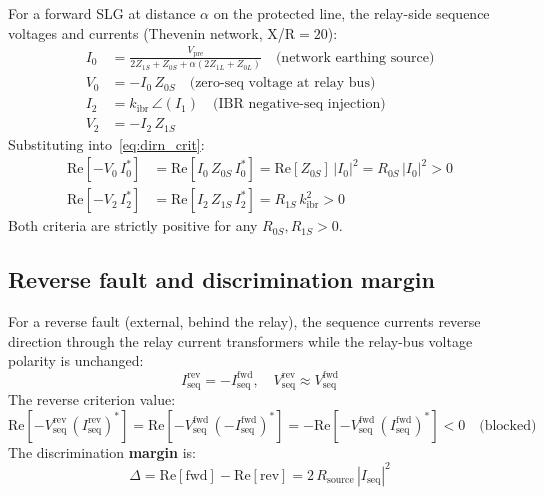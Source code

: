 \documentclass[11pt,a4paper]{article}
\begin{document}
For a forward SLG at distance $\alpha$ on the protected line, the relay-side
sequence voltages and currents (Thevenin network, X/R$=20$):
\begin{align}
  I_0 &= \frac{V_\mathrm{pre}}{2Z_{1S}+Z_{0S}+\alpha(2Z_{1L}+Z_{0L})}
         \quad\text{(network earthing source)} \label{eq:I0_fwd}\\
  V_0 &= -I_0\,Z_{0S}
         \quad\text{(zero-seq voltage at relay bus)} \label{eq:V0_fwd}\\
  I_2 &= k_\mathrm{ibr}\,\angle(I_1)
         \quad\text{(IBR negative-seq injection)} \label{eq:I2_fwd}\\
  V_2 &= -I_2\,Z_{1S} \label{eq:V2_fwd}
\end{align}
Substituting into~\eqref{eq:dirn_crit}:
\begin{align}
  \mathrm{Re}[-V_0\,I_0^*] &= \mathrm{Re}[I_0\,Z_{0S}\,I_0^*]
    = \mathrm{Re}[Z_{0S}]\,|I_0|^2 = R_{0S}\,|I_0|^2 > 0 \label{eq:crit_67n}\\
  \mathrm{Re}[-V_2\,I_2^*] &= \mathrm{Re}[I_2\,Z_{1S}\,I_2^*]
    = R_{1S}\,k_\mathrm{ibr}^2 > 0 \label{eq:crit_67q}
\end{align}
Both criteria are strictly positive for any $R_{0S}, R_{1S} > 0$.

\subsection{Reverse fault and discrimination margin}

For a reverse fault (external, behind the relay), the sequence currents reverse
direction through the relay current transformers while the relay-bus voltage
polarity is unchanged:
\begin{equation}
  I_\mathrm{seq}^\mathrm{rev} = -I_\mathrm{seq}^\mathrm{fwd},\quad
  V_\mathrm{seq}^\mathrm{rev} \approx V_\mathrm{seq}^\mathrm{fwd}
  \label{eq:rev_model}
\end{equation}
The reverse criterion value:
\begin{equation}
  \mathrm{Re}[-V_\mathrm{seq}^\mathrm{rev}\,(I_\mathrm{seq}^\mathrm{rev})^*]
  = \mathrm{Re}[-V_\mathrm{seq}^\mathrm{fwd}\,(-I_\mathrm{seq}^\mathrm{fwd})^*]
  = -\mathrm{Re}[-V_\mathrm{seq}^\mathrm{fwd}\,(I_\mathrm{seq}^\mathrm{fwd})^*]
  < 0 \quad\text{(blocked)}
  \label{eq:crit_rev}
\end{equation}
The discrimination \textbf{margin} is:
\begin{equation}
  \Delta = \mathrm{Re}[\text{fwd}] - \mathrm{Re}[\text{rev}]
         = 2\,R_\mathrm{source}\,|I_\mathrm{seq}|^2
  \label{eq:margin}
\end{equation}
\end{document}
